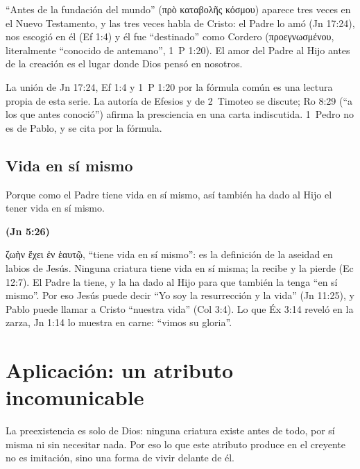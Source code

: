 \documentclass[11pt,letterpaper]{article}
\newcommand{\grc}[1]{\foreignlanguage{ancientgreek}{#1}}
\newcommand{\fuente}[1]{\par\hfill{\upshape\bfseries\small\textcolor{azul}{#1}}}
\begin{document}
``Antes de la fundación del mundo'' (\grc{πρὸ καταβολῆς κόσμου}) aparece tres veces en el Nuevo Testamento, y las tres veces habla de Cristo: el Padre lo amó (Jn 17:24), nos escogió en él (Ef 1:4) y él fue ``destinado'' como Cordero (\grc{προεγνωσμένου}, literalmente ``conocido de antemano'', 1~P 1:20). El amor del Padre al Hijo antes de la creación es el lugar donde Dios pensó en nosotros.

\begin{nota}[Precisión]
La unión de Jn 17:24, Ef 1:4 y 1~P 1:20 por la fórmula común es una lectura propia de esta serie. La autoría de Efesios y de 2~Timoteo se discute; Ro 8:29 (``a los que antes conoció'') afirma la presciencia en una carta indiscutida. 1~Pedro no es de Pablo, y se cita por la fórmula.
\end{nota}

\subsection{Vida en sí mismo}
\begin{cita}Porque como el Padre tiene vida en sí mismo, así también ha dado al Hijo el tener vida en sí mismo.\fuente{(Jn 5:26)}\end{cita}

\grc{ζωὴν ἔχει ἐν ἑαυτῷ}, ``tiene vida en sí mismo'': es la definición de la aseidad en labios de Jesús. Ninguna criatura tiene vida en sí misma; la recibe y la pierde (Ec 12:7). El Padre la tiene, y la ha dado al Hijo para que también la tenga ``en sí mismo''. Por eso Jesús puede decir ``Yo soy la resurrección y la vida'' (Jn 11:25), y Pablo puede llamar a Cristo ``nuestra vida'' (Col 3:4). Lo que Éx 3:14 reveló en la zarza, Jn 1:14 lo muestra en carne: ``vimos su gloria''.

\section{Aplicación: un atributo incomunicable}

La preexistencia es solo de Dios: ninguna criatura existe antes de todo, por sí misma ni sin necesitar nada. Por eso lo que este atributo produce en el creyente no es imitación, sino una forma de vivir delante de él.
\end{document}
